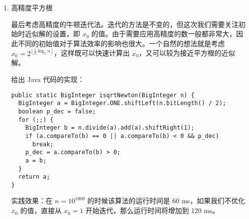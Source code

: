 \begin{enumerate}
\item 高精度平方根

最后考虑高精度的牛顿迭代法。迭代的方法是不变的，但这次我们需要关注初始时近似解的设置，即 $x_0$ 的值。由于需要应用高精度的数一般都非常大，因此不同的初始值对于算法效率的影响也很大。一个自然的想法就是考虑 $x_0=2^{\left\lfloor\frac{1}{2}\log_2n\right\rfloor}$，这样既可以快速计算出 $x_0$，又可以较为接近平方根的近似解。

给出 Java 代码的实现：

\begin{lstlisting}
public static BigInteger isqrtNewton(BigInteger n) {
  BigInteger a = BigInteger.ONE.shiftLeft(n.bitLength() / 2);
  boolean p_dec = false;
  for (;;) {
    BigInteger b = n.divide(a).add(a).shiftRight(1);
    if (a.compareTo(b) == 0 || a.compareTo(b) < 0 && p_dec)
      break;
    p_dec = a.compareTo(b) > 0;
    a = b;
  }
  return a;
}
\end{lstlisting}

实践效果：在 $n=10^{1000}$ 的时候该算法的运行时间是 60 ms，如果我们不优化 $x_0$ 的值，直接从 $x_0=1$ 开始迭代，那么运行时间将增加到 120 ms。

\end{enumerate}
